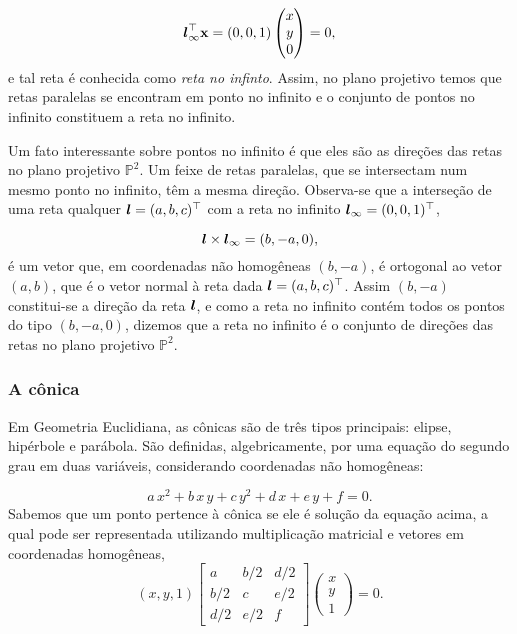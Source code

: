 \begin{equation*}
\boldsymbol{l}_\infty^\top \mathbf{x}=(0,0,1)
\begin{pmatrix}
x\\
y\\
0
\end{pmatrix}
=0,
\end{equation*} 
e tal reta é conhecida como \textit{reta no infinto}. Assim, no plano projetivo temos que retas paralelas se encontram em ponto no infinito e o conjunto de pontos no infinito constituem a reta no infinito.

Um fato interessante sobre pontos no infinito é que eles são as direções das retas no plano projetivo $\mathbb{P}^2$. Um feixe de retas paralelas, que se intersectam num mesmo ponto no infinito, têm a mesma direção. Observa-se que a interseção de uma reta qualquer $\boldsymbol{l}=(a,b,c)^\top$ com a reta no infinito $\boldsymbol{l}_\infty=(0,0,1)^\top$,

\begin{equation*}
\boldsymbol{l}\times \boldsymbol{l}_\infty=(b,-a,0),
\end{equation*}
é um vetor que, em coordenadas não homogêneas $(b,-a)$, é ortogonal ao vetor $(a,b)$, que é o vetor normal à reta dada $\boldsymbol{l}=(a,b,c)^\top$. Assim $(b,-a)$ constitui-se a direção da reta $\boldsymbol{l}$, e como a reta no infinito contém todos os pontos do tipo $(b,-a,0)$, dizemos que a reta no infinito é o conjunto de direções das retas no plano projetivo $\mathbb{P}^2$.\\

\subsubsection{A cônica}\label{sec.definicao-conica}


Em Geometria Euclidiana, as cônicas são de três tipos principais: elipse, hipérbole e parábola. São definidas, algebricamente, por uma equação do segundo grau em duas variáveis, considerando coordenadas não homogêneas:

\begin{equation*}
a\,x^2+b\,x\,y+c\,y^2+d\,x+e\,y+f=0.
\end{equation*}
Sabemos que um ponto pertence à cônica se ele é solução da equação acima, a qual pode ser representada utilizando multiplicação matricial e vetores em coordenadas homogêneas,
\begin{equation*}
(x,y,1) 
 \begin{bmatrix}
a & b/2 & d/2\\
b/2 & c & e/2\\
d/2 & e/2 & f
\end{bmatrix}
 \begin{pmatrix}
x\\
y\\
1
\end{pmatrix}
 = 0.
\end{equation*}

